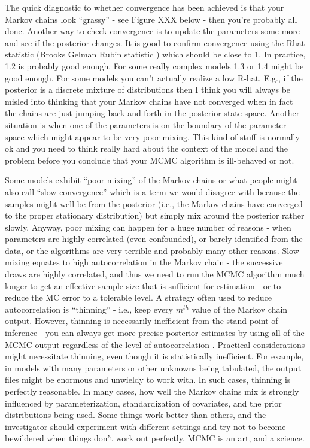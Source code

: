 The quick diagnostic to whether convergence has been achieved is that
your Markov chains look ``grassy'' - see Figure XXX below - then
you're probably all done. Another way to check convergence is to
update the parameters some more and see if the posterior changes. It
is good to confirm convergence using the Rhat statistic (Brooks Gelman
Rubin statistic \citep{gelman_etal:1996}) which should be close to 1. In practice, 1.2 is probably good enough. For some really complex models 1.3 or 1.4 might be good enough. For some models you can't actually realize a low R-hat. E.g., if the posterior is a discrete mixture of distributions then I think you will always be misled into thinking that your Markov chains have not converged when in fact the chains are just jumping back and forth in the posterior state-space. Another situation is when one of the parameters is on the boundary of the parameter space which might appear to be very poor mixing. This kind of stuff is normally ok and you need to think really hard about the context of the model and the problem before you conclude that your MCMC algorithm is ill-behaved or not.

Some models exhibit ``poor mixing'' of the Markov chains or what
people might also call ``slow convergence'' which is a term we would
disagree with because the samples might well be from the posterior
(i.e., the Markov chains have converged to the proper stationary
distribution) but simply mix around the posterior rather
slowly. Anyway, poor mixing can happen for a huge number of reasons -
when parameters are highly correlated (even confounded), or barely
identified from the data, or the algorithms are very terrible and
probably many other reasons.  Slow mixing equates to high
autocorrelation in the Markov chain - the successive draws are highly
correlated, and thus we need to run the MCMC algorithm much longer to
get an effective sample size that is sufficient for estimation - or to
reduce the MC error to a tolerable level.  A strategy often used to
reduce autocorrelation is ``thinning'' - i.e., keep every $m^{th}$
value of the Markov chain output. However, thinning is necessarily
inefficient from the stand point of inference - you can always get
more precise posterior estimates by using all of the MCMC output
regardless of the level of autocorrelation \citep{maceachern_berliner:1994}. Practical considerations might necessitate thinning, even though it is statistically inefficient. For example, in models with many parameters or other unknowns being tabulated, the output files might be enormous and unwieldy to work with. In such cases, thinning is perfectly reasonable. In many cases, how well the Markov chains mix is strongly influenced by parameterization, standardization of covariates, and the prior distributions being used. Some things work better than others, and the investigator should experiment with different settings and try not to become bewildered when things don't work out perfectly. MCMC is an art, and a science. 


